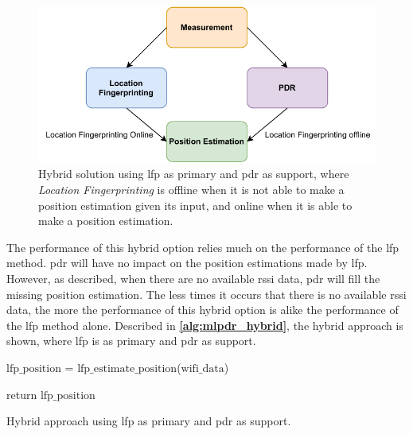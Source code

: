 \begin{figure}[H]
    \centering
    \includegraphics[scale=0.85]{Images/Experiments/hybrid/approach1.pdf}
    \caption{Hybrid solution using \gls{lfp} as primary and \gls{pdr} as support, where \textit{Location Fingerprinting} is offline when it is not able to make a position estimation given its input, and online when it is able to make a position estimation.}
     \label{fig:hybrid1}
\end{figure}

The performance of this hybrid option relies much on the performance of the \gls{lfp} method. \gls{pdr} will have no impact on the position estimations made by \gls{lfp}. However, as described, when there are no available \gls{rssi} data, \gls{pdr} will fill the missing position estimation. The less times it occurs that there is no available \gls{rssi} data, the more the performance of this hybrid option is alike the performance of the \gls{lfp} method alone. Described in \textbf{\autoref{alg:mlpdr_hybrid}}, the hybrid approach is shown, where \gls{lfp} is as primary and \gls{pdr} as support. 

\begin{algorithm}[H]
\SetAlgoLined
{}
  $\text{lfp\_position}$ = $\text{lfp\_estimate\_position}$($\text{wifi\_data}$)\;
  
  
  return $\text{lfp\_position}$\;
 \caption{Hybrid approach using \gls{lfp} as primary and \gls{pdr} as support.}
 \label{alg:mlpdr_hybrid}
\end{algorithm}


